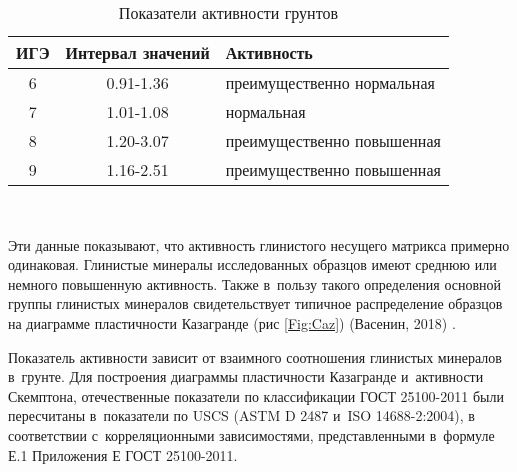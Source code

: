 \begin{table}[]
    \centering
    \caption{Показатели активности грунтов} \label{tab:ak}
    \begin{tabular}{@{}ccl@{}}
    \toprule
    ИГЭ & Интервал значений & Активность\\ \midrule
    6	& 0.91-1.36	&  преимущественно нормальная  \\
    7	& 1.01-1.08	&  нормальная  \\
    8	& 1.20-3.07	&  преимущественно повышенная 	 \\
    9	& 1.16-2.51	& преимущественно повышенная\\ \bottomrule
    \end{tabular}
    \\ 
\end{table}
    

Эти данные показывают, что активность глинистого несущего матрикса примерно одинаковая. Глинистые минералы исследованных образцов имеют среднюю или немного повышенную активность.
Также в~пользу такого определения основной группы глинистых минералов свидетельствует типичное распределение образцов на диаграмме пластичности Казагранде (рис \ref{Fig:Caz}) (Васенин, 2018) \cite{vasenin2018}.

Показатель активности зависит от взаимного соотношения глинистых минералов в~грунте.
Для построения диаграммы пластичности Казагранде и~активности Скемптона, отечественные показатели по классификации ГОСТ 25100-2011 были пересчитаны в~показатели по USCS (ASTM D 2487 и~ISO 14688-2:2004), 
в соответствии с~корреляционными зависимостями, представленными в~формуле Е.1 Приложения Е ГОСТ 25100-2011.








